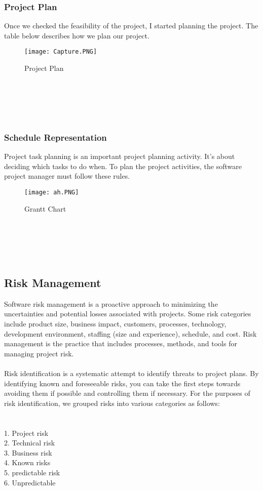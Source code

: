 \documentclass{article}
\begin{document}
\subsubsection{Project Plan}
Once we checked the feasibility of the project, I started planning the project. The table below describes how we plan our project.
\begin{figure}[htp]
    \centering
    \texttt{[image: Capture.PNG]}
    \caption{Project Plan  }
    \label{fig:Project Plan  }
\end{figure}
\\\\\\\
\newpage
\subsubsection{Schedule Representation}
Project task planning is an important project planning activity. It's about deciding which tasks to do when. To plan the project activities, the software project manager must follow these rules.
\begin{figure}[htp]
    \centering
    \texttt{[image: ah.PNG]}
    \caption{Grantt Chart }
    \label{fig:Grant Chart  }
\end{figure}
\\\\\\\
\newpage
\subsection{Risk Management }
Software risk management is a proactive approach to minimizing the uncertainties and potential losses associated with projects. Some risk categories include product size, business impact, customers, processes, technology, development environment, staffing (size and experience), schedule, and cost. Risk management is the practice that includes processes, methods, and tools for managing project risk.\\\\
Risk identification is a systematic attempt to identify threats to project plans. By identifying known and foreseeable risks, you can take the first steps towards avoiding them if possible and controlling them if necessary. For the purposes of risk identification, we grouped risks into various categories as follows:\\\\
\\
1. Project risk\\
2. Technical risk\\
3. Business risk\\
4. Known risks\\
5. predictable risk\\
6. Unpredictable\\
\newpage
\end{document}
